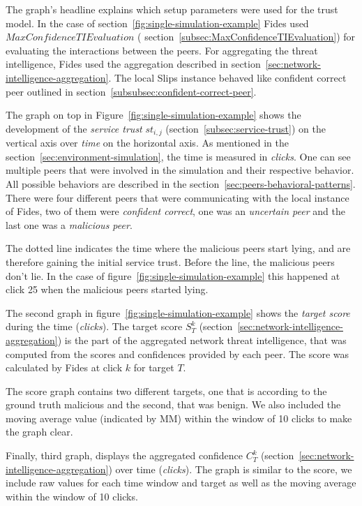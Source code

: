 The graph's headline explains which setup parameters were used for the trust model. In the case of section~\ref{fig:single-simulation-example} Fides used $MaxConfidenceTIEvaluation$ ( section~\ref{subsec:MaxConfidenceTIEvaluation}) for evaluating the interactions between the peers.
For aggregating the threat intelligence, Fides used the aggregation described in  section~\ref{sec:network-intelligence-aggregation}.
The local Slips instance behaved like confident correct peer outlined in  section~\ref{subsubsec:confident-correct-peer}.

The graph on top in Figure~\ref{fig:single-simulation-example} shows the development of the \textit{service trust} $st_{i, j}$ (section~\ref{subsec:service-trust}) on the vertical axis over \textit{time} on the horizontal axis. As mentioned in the section~\ref{sec:environment-simulation}, the time is measured in \textit{clicks}.
One can see multiple peers that were involved in the simulation and their respective behavior. All possible behaviors are described in the section~\ref{sec:peers-behavioral-patterns}.
There were four different peers that were communicating with the local instance of Fides, two of them were \textit{confident correct}, one was an \textit{uncertain peer} and the last one was a \textit{malicious peer}.

The dotted line indicates the time where the malicious peers start lying, and are therefore gaining the initial service trust. Before the line, the malicious peers don't lie.
In the case of figure~\ref{fig:single-simulation-example} this happened at click 25 when the malicious peers started lying.

The second graph in figure~\ref{fig:single-simulation-example} shows the \textit{target score} during the time (\textit{clicks}).
The target score $S^{k}_{T}$ (section~\ref{sec:network-intelligence-aggregation}) is the part of the aggregated network threat intelligence, that was computed from the scores and confidences provided by each peer.
The score was calculated by Fides at click $k$ for target $T$.

The score graph contains two different targets, one that is according to the ground truth malicious and the second, that was benign.
We also included the moving average value (indicated by MM) within the window of 10 clicks to make the graph clear.

Finally, third graph, displays the aggregated confidence $C^{k}_{T}$ (section~\ref{sec:network-intelligence-aggregation}) over time (\textit{clicks}).
The graph is similar to the score, we include raw values for each time window and target as well as the moving average within the window of 10 clicks.

